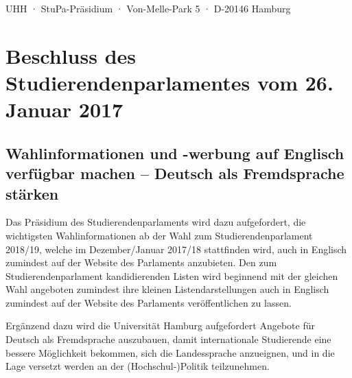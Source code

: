 \documentclass[ngerman,headheight=70pt]{scrartcl}
\begin{document}
    UHH · StuPa-Präsidium · Von-Melle-Park 5 · D-20146 Hamburg

    \section*{Beschluss des Studierendenparlamentes vom 26. Januar 2017}
    \subsection*{Wahlinformationen und -werbung auf Englisch verfügbar machen --
    Deutsch als Fremdsprache stärken}

    Das Präsidium des Studierendenparlaments wird dazu aufgefordert, die
    wichtigsten Wahlinformationen ab der Wahl zum Studierendenparlament 2018/19,
    welche im Dezember/Januar 2017/18 stattfinden wird, auch in Englisch zumindest
    auf der Website des Parlaments anzubieten. Den zum Studierendenparlament
    kandidierenden Listen wird beginnend mit der gleichen Wahl angeboten zumindest
    ihre kleinen Listendarstellungen auch in Englisch zumindest auf der Website
    des Parlaments veröffentlichen zu lassen.

    Ergänzend dazu wird die Universität Hamburg aufgefordert Angebote für Deutsch
    als Fremdsprache auszubauen, damit internationale Studierende eine bessere
    Möglichkeit bekommen, sich die Landessprache anzueignen, und in die Lage
    versetzt werden an der (Hochschul-)Politik teilzunehmen.
\end{document}
